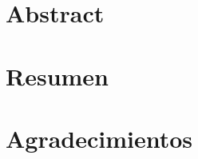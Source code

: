 
\chapter*{Abstract}
\thispagestyle{empty}




\chapter*{Resumen}
\thispagestyle{empty}




\cleardoublepage %
\chapter*{Agradecimientos}

\thispagestyle{empty}
\vspace{1cm}




\cleardoublepage %
\chapter*{}
\setlength{\leftmargin}{0.5\textwidth}
\setlength{\parsep}{0cm}
\addtolength{\topsep}{0.5cm}
\cleardoublepage %
